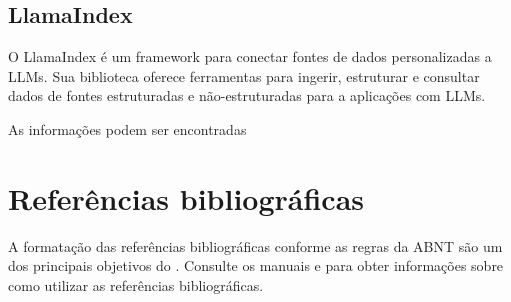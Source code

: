 \documentclass[
	12pt,				%
	openright,			%
	oneside,			    %
	a4paper,				%
	english,			%
	french,			%
	spanish,			%
	brazil			%
	]{abntex2}
\begin{document}
    \subsection{LlamaIndex}
    O LlamaIndex é um framework para conectar fontes de dados personalizadas a LLMs. Sua biblioteca oferece ferramentas para ingerir, estruturar e consultar dados de fontes estruturadas e não-estruturadas para a aplicações com LLMs.
    
    As informações podem ser encontradas \cite{https://docs.llamaindex.ai/en/stable/}
\postextual


\section{Referências bibliográficas}

A formatação das referências bibliográficas conforme as regras da ABNT são um
dos principais objetivos do \abnTeX. Consulte os manuais
 e  para obter informações
sobre como utilizar as referências bibliográficas.
\end{document}
